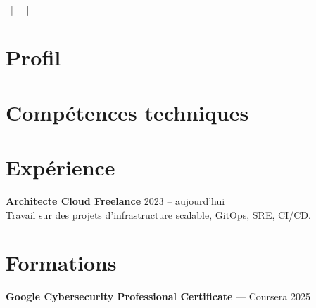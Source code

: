 \documentclass[a4paper,10pt]{article}
\begin{document}
\begin{center}
    {\LARGE \textbf{\myname}} \\
    \href{mailto:\mymail}{\mymail} ~|~
    \href{https://\mygithub}{\mygithub} ~|~
    \mylocation
\end{center}

\vspace{0.5cm}

\section*{Profil}
\myprofil

\section*{Compétences techniques}
\mytechskills

\section*{Expérience}

\textbf{Architecte Cloud Freelance} \hfill 2023 – aujourd’hui \\
Travail sur des projets d’infrastructure scalable, GitOps, SRE, CI/CD.

\section*{Formations}

\textbf{Google Cybersecurity Professional Certificate} — Coursera \hfill 2025
\end{document}

